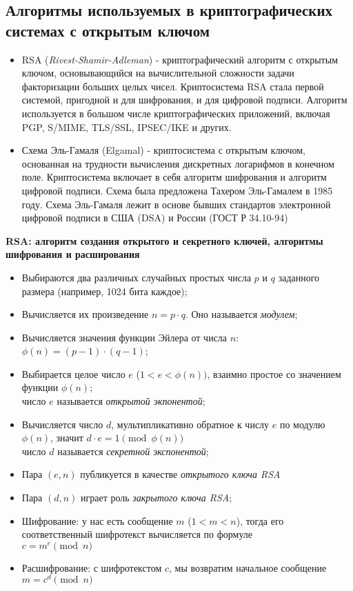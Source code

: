 \subsection{Алгоритмы используемых в криптографических системах с открытым ключом}
\begin{itemize}[label={--},noitemsep,nolistsep]
	\item RSA (\textit{Rivest-Shamir-Adleman}) - криптографический алгоритм с открытым ключом, основывающийся на вычислительной сложности задачи факторизации больших целых чисел. Криптосистема RSA стала первой системой, пригодной и для шифрования, и для цифровой подписи. Алгоритм используется в большом числе криптографических приложений, включая PGP, S/MIME, TLS/SSL, IPSEC/IKE и других.
	\item Схема Эль-Гамаля (Elgamal) - криптосистема с открытым ключом, основанная на трудности вычисления дискретных логарифмов в конечном поле. Криптосистема включает в себя алгоритм шифрования и алгоритм цифровой подписи. Схема была предложена Тахером Эль-Гамалем в 1985 году. Схема Эль-Гамаля лежит в основе бывших стандартов электронной цифровой подписи в США (DSA) и России (ГОСТ Р 34.10-94)
\end{itemize}

\textbf{RSA: алгоритм создания открытого и секретного ключей, алгоритмы шифрования и расширования} \cite{introcrypto}
\begin{itemize}[label={--},noitemsep,nolistsep]
	\item Выбираются два различных случайных простых числа $p$ и $q$ заданного размера (например, 1024 бита каждое);
	\item Вычисляется их произведение $n=p \cdot q$. Оно называется \textit{модулем};
	\item Вычисляется значения функции Эйлера от числа $n$: $\phi(n) = (p-1)\cdot(q-1)$;
	\item Выбирается целое число $e$ ($1 < e < \phi(n))$, взаимно простое со значением функции $\phi(n)$; \\ число $e$ называется \textit{открытой экпонентой};
	\item Вычисляется число $d$, мультипликативно обратное к числу $e$ по модулю $\phi(n)$, значит $d \cdot e = 1 \pmod{\phi(n)}$ \\ число $d$ называется \textit{секретной экспонентой};
	\item Пара $(e, n)$ публикуется в качестве \textit{открытого ключа RSA}
	\item Пара $(d, n)$ играет роль \textit{закрытого ключа RSA};
	\item Шифрование: у нас есть сообщение $m$ ($1 < m < n$), тогда его соответственный шифротекст вычисляется по формуле \\ $c = m^e \pmod n$
	\item Расшифрование: с шифротекстом $c$, мы возвратим начальное сообщение $m = c^d \pmod n$
\end{itemize}

